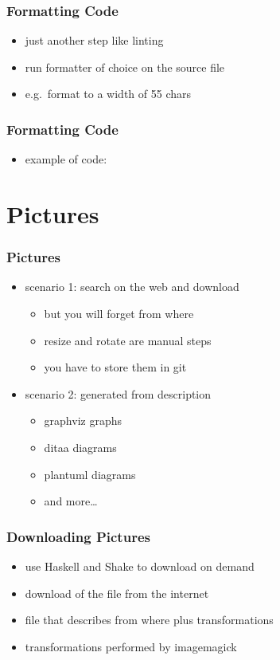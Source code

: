 \documentclass{beamer}
\begin{document}
\begin{frame}
  \frametitle{Formatting Code}
  \begin{itemize}
  \item just another step like linting
  \item run formatter of choice on the source file
  \item e.g.\ format to a width of 55 chars
  \end{itemize}
\end{frame}

\begin{frame}
  \frametitle{Formatting Code}
  \begin{itemize}
  \item example of code:
  \end{itemize}
\end{frame}

\section{Pictures}

\begin{frame}
  \frametitle{Pictures}
  \begin{itemize}
  \item scenario 1: search on the web and download
    \begin{itemize}
    \item but you will forget from where
    \item resize and rotate are manual steps
    \item you have to store them in git
    \end{itemize}
  \item scenario 2: generated from description
    \begin{itemize}
    \item graphviz graphs
    \item ditaa diagrams
    \item plantuml diagrams
    \item and more\ldots{}
    \end{itemize}
  \end{itemize}
\end{frame}

\begin{frame}
  \frametitle{Downloading Pictures}
  \begin{itemize}
  \item use Haskell and Shake to download on demand
  \item download of the file from the internet
  \item file that describes from where plus transformations
  \item transformations performed by imagemagick
  \end{itemize}
\end{frame}
\end{document}
